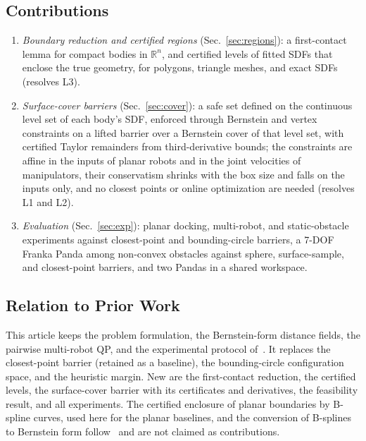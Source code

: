 \documentclass[journal]{IEEEtran}
\theoremstyle{definition}
\newcommand{\R}{\mathbb{R}}
\begin{document}
\subsection{Contributions}
\begin{enumerate}
\item \emph{Boundary reduction and certified regions} (Sec.~\ref{sec:regions}): a first-contact
lemma for compact bodies in $\R^n$, and certified levels of fitted SDFs that enclose the true
geometry, for polygons, triangle meshes, and exact SDFs (resolves L3).
\item \emph{Surface-cover barriers} (Sec.~\ref{sec:cover}): a safe set defined on the continuous level
set of each body's SDF, enforced through Bernstein and vertex constraints on a lifted barrier over a
Bernstein cover of that level set, with certified Taylor remainders from third-derivative bounds;
the constraints are affine in the inputs of planar robots and in the joint velocities of
manipulators, their conservatism shrinks with the box size and falls on the inputs only, and
no closest points or online optimization are needed (resolves L1 and L2).
\item \emph{Evaluation} (Sec.~\ref{sec:exp}): planar docking, multi-robot, and static-obstacle
experiments against closest-point and bounding-circle barriers, a 7-DOF Franka Panda among
non-convex obstacles against sphere, surface-sample, and closest-point barriers, and two Pandas in a
shared workspace.
\end{enumerate}

\subsection{Relation to Prior Work}\label{sec:relation}
This article keeps the problem formulation, the Bernstein-form distance fields, the pairwise
multi-robot QP, and the experimental protocol of~\cite{jo2026geometry}. It replaces the
closest-point barrier (retained as a baseline), the bounding-circle configuration space, and the
heuristic margin. New are the first-contact reduction, the certified levels, the surface-cover
barrier with its certificates and derivatives, the feasibility result, and all experiments. The
certified enclosure of planar boundaries by B-spline curves, used here for the planar baselines, and
the conversion of B-splines to Bernstein form follow~\cite{jo2027semantic} and are not claimed as
contributions.

\end{document}
